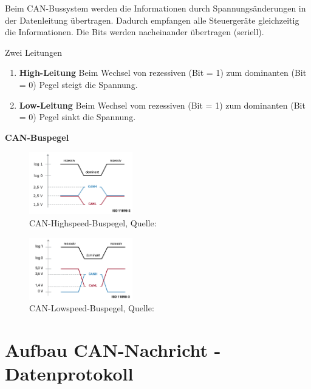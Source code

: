 Beim CAN-Bussystem werden die Informationen durch Spannungsänderungen in
der Datenleitung übertragen. Dadurch empfangen alle Steuergeräte
gleichzeitig die Informationen. Die Bits werden nacheinander übertragen
(seriell).

Zwei Leitungen

\begin{enumerate}
\item
  \textbf{High-Leitung} Beim Wechsel von rezessiven (Bit = 1) zum
  dominanten (Bit = 0) Pegel steigt die Spannung.
\item
  \textbf{Low-Leitung} Beim Wechsel vom rezessiven (Bit = 1) zum
  dominanten (Bit = 0) Pegel sinkt die Spannung.
\end{enumerate}

\textbf{CAN-Buspegel}

\begin{figure}[!ht]%
\centering
\includegraphics[width=0.4\textwidth]{images/CAN/CAN-Highspeed-Buspegel.png}
\caption[CAN-Highspeed-Buspegel, Quelle: ]{CAN-Highspeed-Buspegel,
Quelle: \footnotemark{}}
\end{figure}

\begin{figure}[!ht]%
\centering
\includegraphics[width=0.4\textwidth]{images/CAN/CAN-Lowspeed-Buspegel.png}
\caption[CAN-Lowspeed-Buspegel, Quelle: ]{CAN-Lowspeed-Buspegel, Quelle:
\footnotemark{}}
\end{figure}

\newpage

\section{Aufbau CAN-Nachricht -
Datenprotokoll}\label{aufbau-can-nachricht-datenprotokoll}

